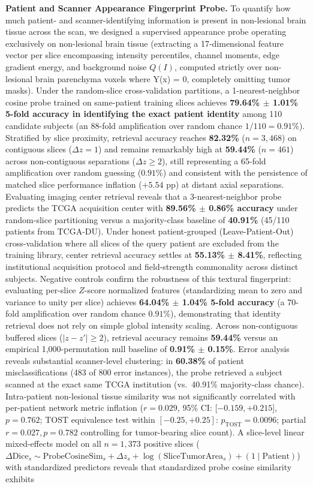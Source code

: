 \documentclass[11pt,a4paper]{article}
\begin{document}
\noindent\textbf{Patient and Scanner Appearance Fingerprint Probe.}
To quantify how much patient- and scanner-identifying information is present in non-lesional brain tissue across the scan, we designed a supervised appearance probe operating exclusively on non-lesional brain tissue (extracting a 17-dimensional feature vector per slice encompassing intensity percentiles, channel moments, edge gradient energy, and background noise $Q(I)$, computed strictly over non-lesional brain parenchyma voxels where Y(x) = 0, completely omitting tumor masks). Under the random-slice cross-validation partitions, a 1-nearest-neighbor cosine probe trained on same-patient training slices achieves \textbf{79.64\% $\pm$ 1.01\% 5-fold accuracy in identifying the exact patient identity} among 110 candidate subjects (an 88-fold amplification over random chance $1/110 = 0.91\%$). Stratified by slice proximity, retrieval accuracy reaches \textbf{82.32\%} ($n=3{,}468$) on contiguous slices ($\Delta z = 1$) and remains remarkably high at \textbf{59.44\%} ($n=461$) across non-contiguous separations ($\Delta z \ge 2$), still representing a 65-fold amplification over random guessing ($0.91\%$) and consistent with the persistence of matched slice performance inflation ($+5.54\text{ pp}$) at distant axial separations. Evaluating imaging center retrieval reveals that a 3-nearest-neighbor probe predicts the TCGA acquisition center with \textbf{89.56\% $\pm$ 0.86\% accuracy} under random-slice partitioning versus a majority-class baseline of \textbf{40.91\%} (45/110 patients from TCGA-DU). Under honest patient-grouped (Leave-Patient-Out) cross-validation where all slices of the query patient are excluded from the training library, center retrieval accuracy settles at \textbf{55.13\% $\pm$ 8.41\%}, reflecting institutional acquisition protocol and field-strength commonality across distinct subjects. Negative controls confirm the robustness of this textural fingerprint: evaluating per-slice $Z$-score normalized features (standardizing mean to zero and variance to unity per slice) achieves \textbf{64.04\% $\pm$ 1.04\% 5-fold accuracy} (a 70-fold amplification over random chance $0.91\%$), demonstrating that identity retrieval does not rely on simple global intensity scaling. Across non-contiguous buffered slices ($|z - z'| \ge 2$), retrieval accuracy remains \textbf{59.44\%} versus an empirical 1,000-permutation null baseline of \textbf{0.91\% $\pm$ 0.15\%}. Error analysis reveals substantial scanner-level clustering: in \textbf{60.38\%} of patient misclassifications (483 of 800 error instances), the probe retrieved a subject scanned at the exact same TCGA institution (vs.\ 40.91\% majority-class chance). Intra-patient non-lesional tissue similarity was not significantly correlated with per-patient network metric inflation ($r = 0.029$, 95\% CI: [$-0.159, +0.215$], $p = 0.762$; TOST equivalence test within $[-0.25, +0.25]$: $p_{\text{TOST}} = 0.0096$; partial $r = 0.027, p = 0.782$ controlling for tumor-bearing slice count). A slice-level linear mixed-effects model on all $n = 1{,}373$ positive slices ($\Delta\text{Dice}_s \sim \text{ProbeCosineSim}_s + \Delta z_s + \log(\text{SliceTumorArea}_s) + (1 \mid \text{Patient})$) with standardized predictors reveals that standardized probe cosine similarity exhibits 
\end{document}
